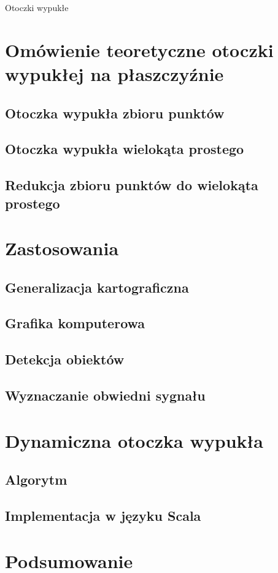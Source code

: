 \newcommand*{\includesDirectory}{includes}
\newcommand*{\settingsDirectory}{\includesDirectory/settings}








    \thispagestyle{empty}
    \begin{center}
        \Huge{Otoczki wypukłe}
    \end{center}
    \tableofcontents	

  

    \chapter{Omówienie teoretyczne otoczki wypukłej na płaszczyźnie}
        \section{Otoczka wypukła zbioru punktów}
        \section{Otoczka wypukła wielokąta prostego}
        \section{Redukcja zbioru punktów do wielokąta prostego}  
    \chapter{Zastosowania} 
        \section{Generalizacja kartograficzna}
		\section{Grafika komputerowa}
		\section{Detekcja obiektów}
        \section{Wyznaczanie obwiedni sygnału}
    \chapter{Dynamiczna otoczka wypukła}
    	\section{Algorytm}
    	\section{Implementacja w języku Scala} 
	\chapter{Podsumowanie} 
      
    


